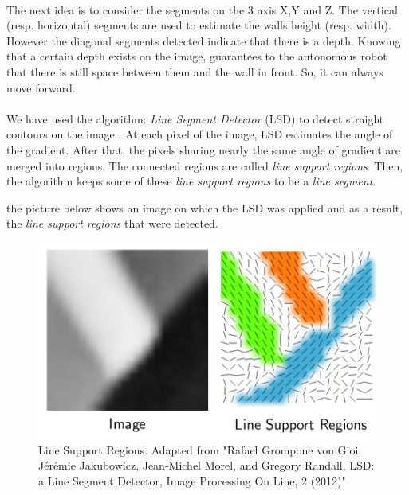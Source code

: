 \documentclass[12pt]{report}
\begin{document}
	 \paragraph{}
	 The next idea is to consider the segments on the 3 axis X,Y and Z. The vertical (resp. horizontal) segments are used to estimate the walls height (resp. width). However the diagonal segments detected indicate that there is a depth. Knowing that a certain depth exists on the image, guarantees to the autonomous robot that there is still space between them and the wall in front. So, it can always move forward.
	  
	  \paragraph{}
	  We have used the algorithm: \textit{Line Segment Detector} (LSD) to detect straight contours on the image \cite{grompone_von_gioi_lsd:_2012}. At each pixel of the image, LSD estimates the angle of the gradient. After that, the pixels sharing nearly the same angle of gradient are merged into regions. The connected regions are called \textit{line support regions}. Then, the algorithm keeps some of these \textit{line support regions} to be a \textit{line segment}.
	  
	  the picture below shows an image on which the LSD was applied and as a result, the \textit{line support regions} that were detected.
	  	\begin{figure}[H]
	  	\begin{center}
	  		\includegraphics[scale=0.6]{res/lsr.png}
	  		\caption{Line Support Regions. Adapted from "Rafael Grompone von Gioi, Jérémie Jakubowicz, Jean-Michel Morel, and Gregory Randall, LSD: a Line Segment Detector, Image Processing On Line, 2 (2012)" }
	  	\end{center}
	  \end{figure}
\end{document}
